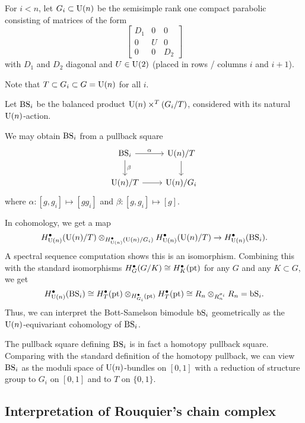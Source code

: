 \begin{dfn}
	For $i < n$, let $G_i \subset \mathrm{U}(n)$ be the semisimple rank one compact parabolic consisting of matrices of the form
	\[
		\begin{bmatrix}
			D_1 & 0 & 0 \\
			0 & U & 0 \\
			0 & 0 & D_2
		\end{bmatrix}
	\]
	with $D_1$ and $D_2$ diagonal and $U \in \mathrm{U}(2)$ (placed in rows / columns $i$ and $i + 1$).
\end{dfn}

Note that $T \subset G_i \subset G = \mathrm{U}(n)$ for all $i$.

\begin{dfn}
	Let $\mathrm{BS}_i$ be the balanced product $\mathrm{U}(n) \times^T (G_i / T)$, considered with its natural $\mathrm{U}(n)$-action.
\end{dfn}

We may obtain $\mathrm{BS}_i$ from a pullback square
\[
	\begin{tikzcd}
		\BS_i \rar["\alpha"] \dar["\beta"] & \U(n) / T \dar \\
		\U(n) / T \rar & \U(n) / G_i
	\end{tikzcd}
\]
where $\alpha: [g, g_i] \mapsto [g g_i]$ and $\beta: [g, g_i] \mapsto [g]$.

In cohomology, we get a map
\[
	H^\bullet_{\mathrm{U}(n)}(\mathrm{U}(n)/T) \otimes_{H^\bullet_{\mathrm{U}(n)}(\mathrm{U}(n)/G_i)} H^\bullet_{\mathrm{U}(n)}(\mathrm{U}(n)/T) \to H^\bullet_{\mathrm{U}(n)}(\mathrm{BS}_i).
\]
A spectral sequence computation shows this is an isomorphism.
Combining this with the standard isomorphisms $H^\bullet_G(G / K) \cong H^\bullet_K(\operatorname{pt})$ for any $G$ and any $K \subset G$, we get
\[
	H^\bullet_{\mathrm{U}(n)}(\mathrm{BS}_i) \cong H^\bullet_T(\operatorname{pt}) \otimes_{H^\bullet_{G_i}(\operatorname{pt})} H^\bullet_T(\operatorname{pt}) \cong R_n \otimes_{R_n^{\sigma_i}} R_n = \mathrm{bS}_i.
\]
Thus, we can interpret the Bott-Samelson bimodule $\mathrm{bS}_i$ geometrically as the $\mathrm{U}(n)$-equivariant cohomology of $\mathrm{BS}_i$.

The pullback square defining $\mathrm{BS}_i$ is in fact a homotopy pullback square.
Comparing with the standard definition of the homotopy pullback, we can view $\mathrm{BS}_i$ as the moduli space of $\mathrm{U}(n)$-bundles on $[0, 1]$ with a reduction of structure group to $G_i$ on $[0, 1]$ and to $T$ on $\{ 0, 1 \}$.

\subsection{Interpretation of Rouquier's chain complex}

